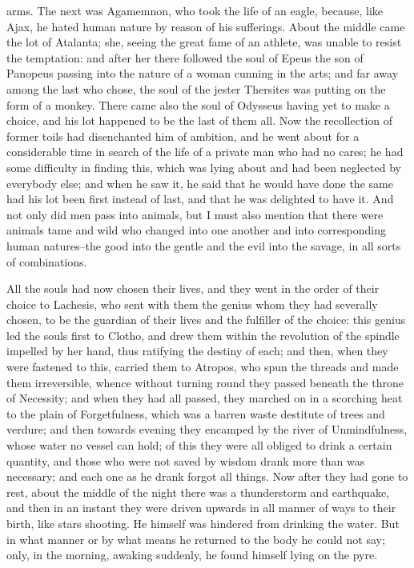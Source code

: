 arms. The next was Agamemnon, who took the life of an eagle, because,
like Ajax, he hated human nature by reason of his sufferings. About
the middle came the lot of Atalanta; she, seeing the great fame of
an athlete, was unable to resist the temptation: and after her there
followed the soul of Epeus the son of Panopeus passing into the nature
of a woman cunning in the arts; and far away among the last who chose,
the soul of the jester Thersites was putting on the form of a monkey.
There came also the soul of Odysseus having yet to make a choice, and
his lot happened to be the last of them all. Now the recollection of
former toils had disenchanted him of ambition, and he went about for
a considerable time in search of the life of a private man who had no
cares; he had some difficulty in finding this, which was lying about and
had been neglected by everybody else; and when he saw it, he said that
he would have done the same had his lot been first instead of last,
and that he was delighted to have it. And not only did men pass into
animals, but I must also mention that there were animals tame and wild
who changed into one another and into corresponding human natures--the
good into the gentle and the evil into the savage, in all sorts of
combinations.

All the souls had now chosen their lives, and they went in the order of
their choice to Lachesis, who sent with them the genius whom they had
severally chosen, to be the guardian of their lives and the fulfiller
of the choice: this genius led the souls first to Clotho, and drew
them within the revolution of the spindle impelled by her hand, thus
ratifying the destiny of each; and then, when they were fastened to
this, carried them to Atropos, who spun the threads and made them
irreversible, whence without turning round they passed beneath the
throne of Necessity; and when they had all passed, they marched on in a
scorching heat to the plain of Forgetfulness, which was a barren waste
destitute of trees and verdure; and then towards evening they encamped
by the river of Unmindfulness, whose water no vessel can hold; of this
they were all obliged to drink a certain quantity, and those who were
not saved by wisdom drank more than was necessary; and each one as he
drank forgot all things. Now after they had gone to rest, about the
middle of the night there was a thunderstorm and earthquake, and then
in an instant they were driven upwards in all manner of ways to their
birth, like stars shooting. He himself was hindered from drinking the
water. But in what manner or by what means he returned to the body he
could not say; only, in the morning, awaking suddenly, he found himself
lying on the pyre.

